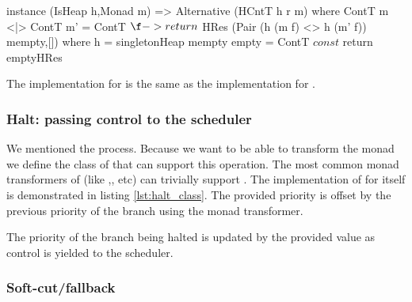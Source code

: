 \begin{code}
\begin{haskellcode}
instance (IsHeap h,Monad m) => Alternative (HCntT h r m) where
  ContT m <|> ContT m' = ContT $ \f -> return
    $ HRes (Pair (h (m f) <> h (m' f)) mempty,[])
    where
      h = singletonHeap mempty
  empty = ContT $ const $ return emptyHRes
\end{haskellcode}
  \caption{\label{lst:alternative_impl}The implementation for
     is the same as the implementation for
    .}
\end{code}

\subsubsection{Halt: passing control to the scheduler}

We mentioned the   process. Because we want to
be able to transform the  monad we define the class of
 that can support this operation. The most common monad
transformers of  (like ,, etc)
can trivially support . The implementation of 
for  itself is demonstrated in listing
\ref{lst:halt_class}. The provided priority is offset by the previous
priority of the branch using the  monad transformer.

\begin{code}
  \caption{\label{lst:halt_class}The
    priority of the branch being halted is updated
    by the provided value as control is yielded to the scheduler.}
\end{code}


\subsubsection{Soft-cut/fallback}

